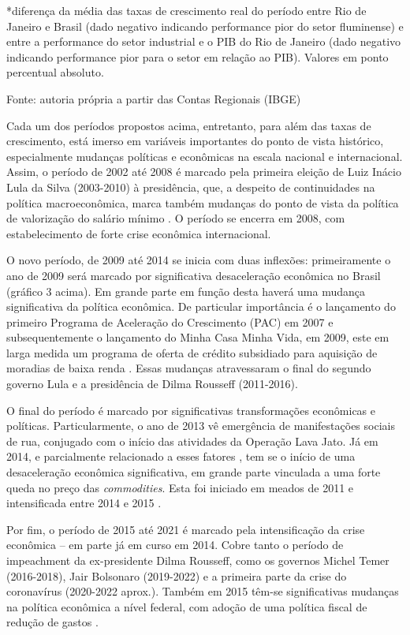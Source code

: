 *diferença da média das taxas de crescimento real do período entre Rio de
Janeiro e Brasil (dado negativo indicando performance pior do setor
fluminense) e entre a performance do setor industrial e o PIB do Rio de
Janeiro (dado negativo indicando performance pior para o setor em
relação ao PIB). Valores em ponto percentual absoluto.

Fonte: autoria própria a partir das Contas Regionais (IBGE)

Cada um dos períodos propostos acima, entretanto, para além das taxas de
crescimento, está imerso em variáveis importantes do ponto de vista
histórico, especialmente mudanças políticas e econômicas na escala
nacional e internacional. Assim, o período de 2002 até 2008 é marcado
pela primeira eleição de Luiz Inácio Lula da Silva (2003-2010) à
presidência, que, a despeito de continuidades na política
macroeconômica, marca também mudanças do ponto de vista da política de
valorização do salário mínimo
\citep{cosenza_brasil_2022}. O
período se encerra em 2008, com estabelecimento de forte crise econômica
internacional.

O novo período, de 2009 até 2014 se inicia com duas inflexões:
primeiramente o ano de 2009 será marcado por significativa desaceleração
econômica no Brasil (gráfico 3 acima). Em grande parte em função desta
haverá uma mudança significativa da política econômica. De particular
importância é o lançamento do primeiro Programa de Aceleração do
Crescimento (PAC) em 2007
\citep{rousseff_programa_2007} e
subsequentemente o lançamento do Minha Casa Minha Vida, em 2009, este em
larga medida um programa de oferta de crédito subsidiado para aquisição
de moradias de baixa renda
\citep{brasil_lei_2009}. Essas
mudanças atravessaram o final do segundo governo Lula e a presidência de
Dilma Rousseff (2011-2016).

O final do período é marcado por significativas transformações
econômicas e políticas. Particularmente, o ano de 2013 vê emergência de
manifestações sociais de rua, conjugado com o início das atividades da
Operação Lava Jato. Já em 2014, e parcialmente relacionado a esses
fatores \citep{dieese_implicacoes_2021}, tem se o início de uma desaceleração econômica significativa, em
grande parte vinculada a uma forte queda no preço das
\emph{commodities}. Esta foi iniciado em meados de 2011 e intensificada
entre 2014 e 2015
\citep{fonseca_politica_2020}.

Por fim, o período de 2015 até 2021 é marcado pela intensificação da
crise econômica -- em parte já em curso em 2014. Cobre tanto o período
de impeachment da ex-presidente Dilma Rousseff, como os governos Michel
Temer (2016-2018), Jair Bolsonaro (2019-2022) e a primeira parte da
crise do coronavírus (2020-2022 aprox.). Também em 2015 têm-se
significativas mudanças na política econômica a nível federal, com
adoção de uma política fiscal de redução de gastos
\citep{fonseca_politica_2020}.

